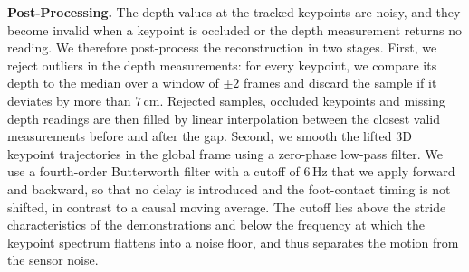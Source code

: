 
\textbf{Post-Processing.} The depth values at the tracked keypoints are noisy, and they become invalid when a keypoint is occluded or the depth measurement returns no reading. We therefore post-process the reconstruction in two stages. First, we reject outliers in the depth measurements: for every keypoint, we compare its depth to the median over a window of $\pm 2$ frames and discard the sample if it deviates by more than $7\,\mathrm{cm}$. Rejected samples, occluded keypoints and missing depth readings are then filled by linear interpolation between the closest valid measurements before and after the gap. Second, we smooth the lifted 3D keypoint trajectories in the global frame using a zero-phase low-pass filter. We use a fourth-order Butterworth filter with a cutoff of $6\,$Hz that we apply forward and backward, so that no delay is introduced and the foot-contact timing is not shifted, in contrast to a causal moving average. The cutoff lies above the stride characteristics of the demonstrations and below the frequency at which the keypoint spectrum flattens into a noise floor, and thus separates the motion from the sensor noise.

